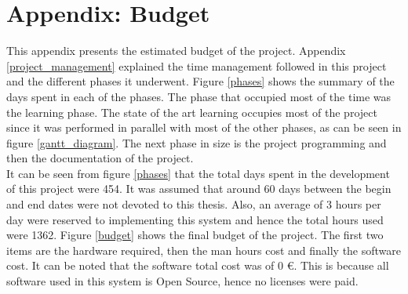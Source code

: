 
	\section{Appendix: Budget}
		This appendix presents the estimated budget of the project. 
		Appendix \ref{project_management} explained the time management followed in this project and the different phases it underwent. 
		Figure \ref{phases} shows the summary of the days spent in each of the phases. 
		The phase that occupied most of the time was the learning phase. 
		The state of the art learning occupies most of the project since it was performed in parallel with most of the other phases, as can be seen in figure \ref{gantt_diagram}. 
		The next phase in size is the project programming and then the documentation of the project. 
		\\

		It can be seen from figure \ref{phases} that the total days spent in the development of this project were 454. 
		It was assumed that around 60 days between the begin and end dates were not devoted to this thesis. 
		Also, an average of 3 hours per day were reserved to implementing this system and hence the total hours used were 1362. 
		Figure \ref{budget} shows the final budget of the project. 
		The first two items are the hardware required, then the man hours cost and finally the software cost. 
		It can be noted that the software total cost was of 0 \euro. 
		This is because all software used in this system is Open Source, hence no licenses were paid. 



